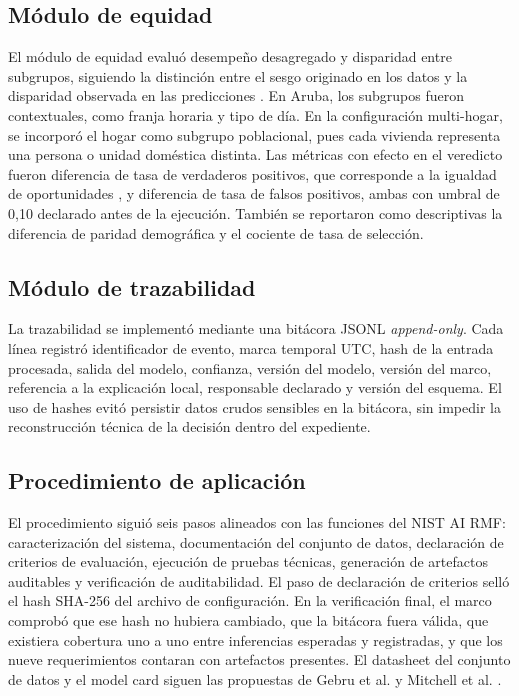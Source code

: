 \subsection{Módulo de equidad}

El módulo de equidad evaluó desempeño desagregado y disparidad entre subgrupos,
siguiendo la distinción entre el sesgo originado en los datos y la disparidad
observada en las predicciones \cite{mehrabi2021survey}.
En Aruba, los subgrupos fueron contextuales, como franja horaria y tipo de día.
En la configuración multi-hogar, se incorporó el hogar como subgrupo
poblacional, pues cada vivienda representa una persona o unidad doméstica
distinta. Las métricas con efecto en el veredicto fueron diferencia de tasa de
verdaderos positivos, que corresponde a la igualdad de oportunidades
\cite{hardt2016equality}, y diferencia de tasa de falsos positivos, ambas con
umbral de 0,10 declarado antes de la ejecución. También se reportaron como
descriptivas la diferencia de paridad demográfica y el cociente de tasa de
selección.

\subsection{Módulo de trazabilidad}

La trazabilidad se implementó mediante una bitácora JSONL \emph{append-only}.
Cada línea registró identificador de evento, marca temporal UTC, hash de la
entrada procesada, salida del modelo, confianza, versión del modelo, versión del
marco, referencia a la explicación local, responsable declarado y versión del
esquema. El uso de hashes evitó persistir datos crudos sensibles en la
bitácora, sin impedir la reconstrucción técnica de la decisión dentro del
expediente.

\subsection{Procedimiento de aplicación}

El procedimiento siguió seis pasos alineados con las funciones del NIST AI RMF:
caracterización del sistema, documentación del conjunto de datos, declaración de
criterios de evaluación, ejecución de pruebas técnicas, generación de artefactos
auditables y verificación de auditabilidad. El paso de declaración de criterios
selló el hash SHA-256 del archivo de configuración. En la verificación final, el
marco comprobó que ese hash no hubiera cambiado, que la bitácora fuera válida,
que existiera cobertura uno a uno entre inferencias esperadas y registradas, y
que los nueve requerimientos contaran con artefactos presentes. El datasheet del
conjunto de datos y el model card siguen las propuestas de Gebru et al.
\cite{gebru2021datasheets} y Mitchell et al. \cite{mitchell2019modelcards}.
